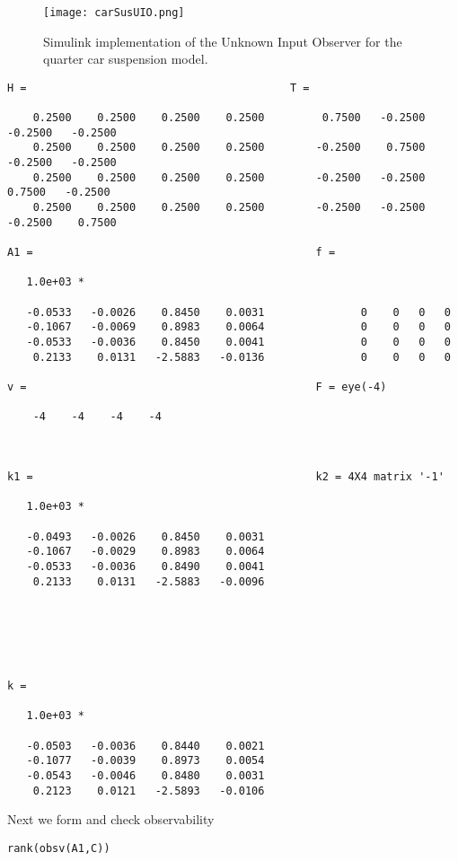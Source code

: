 \documentclass{amsart}
\theoremstyle{definition}
\theoremstyle{remark}
\numberwithin{equation}{section}
\begin{document}
\begin{figure}[H]
    \centering
    \texttt{[image: carSusUIO.png]}
    \caption{Simulink implementation of the Unknown Input Observer for the quarter car suspension model.}
    \label{fig:carSusUIO}
\end{figure}
        \color{lightgray} \begin{verbatim}
H =                                         T = 

    0.2500    0.2500    0.2500    0.2500         0.7500   -0.2500   -0.2500   -0.2500
    0.2500    0.2500    0.2500    0.2500        -0.2500    0.7500   -0.2500   -0.2500
    0.2500    0.2500    0.2500    0.2500        -0.2500   -0.2500    0.7500   -0.2500
    0.2500    0.2500    0.2500    0.2500        -0.2500   -0.2500   -0.2500    0.7500

A1 =                                            f = 

   1.0e+03 *

   -0.0533   -0.0026    0.8450    0.0031               0    0   0   0
   -0.1067   -0.0069    0.8983    0.0064               0    0   0   0
   -0.0533   -0.0036    0.8450    0.0041               0    0   0   0
    0.2133    0.0131   -2.5883   -0.0136               0    0   0   0

v =                                             F = eye(-4)

    -4    -4    -4    -4
    
    

k1 =                                            k2 = 4X4 matrix '-1'

   1.0e+03 *

   -0.0493   -0.0026    0.8450    0.0031
   -0.1067   -0.0029    0.8983    0.0064
   -0.0533   -0.0036    0.8490    0.0041
    0.2133    0.0131   -2.5883   -0.0096






k =

   1.0e+03 *

   -0.0503   -0.0036    0.8440    0.0021
   -0.1077   -0.0039    0.8973    0.0054
   -0.0543   -0.0046    0.8480    0.0031
    0.2123    0.0121   -2.5893   -0.0106

\end{verbatim} \color{black}
    


Next we form  and check observability

\begin{verbatim}
rank(obsv(A1,C))
\end{verbatim}
\end{document}
